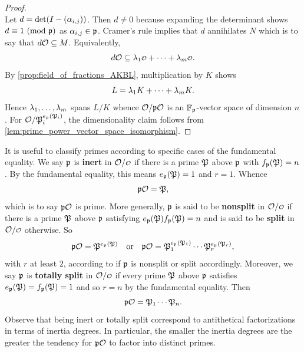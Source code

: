\begin{proof}
\[      \]
      Let \(d = \det(I-(\alpha_{i,j}))\). Then \(d \neq 0\) because expanding the determinant shows \(d \equiv 1 \ (\mathrm{mod}\text{ }\mathfrak{p})\) as \(\alpha_{i,j} \in \mathfrak{p}\). Cramer's rule implies that \(d\) annihilates \(N\) which is to say that \(d\mathcal{O} \subseteq M\). Equivalently,
      \[
        d\mc{O} \subseteq \l_{1}\smc{O}+\cdots+\l_{m}\smc{O}.
      \]
      By \cref{prop:field_of_fractions_AKBL}, multiplication by \(K\) shows
      \[
        L = \lambda_{1}K+\cdots+\lambda_{m}K.
      \]
      Hence \(\lambda_{1},\ldots,\lambda_{m}\) spans \(L/K\) whence \(\mathcal{O}/\mathfrak{p}\mathcal{O}\) is an \(\mathbb{F}_{\mathfrak{p}}\)-vector space of dimension \(n\). For \(\mathcal{O}/\mathfrak{P}_{i}^{e_{\mathfrak{p}}(\mathfrak{P}_{i})}\), the dimensionality claim follows from \cref{lem:prime_power_vector_space_isomorphism}.
    \end{proof}

    It is useful to classify primes according to specific cases of the fundamental equality. We say \(\mathfrak{p}\) is \textbf{inert} in \(\mc{O}/\smc{O}\) if there is a prime \(\mathfrak{P}\) above \(\mathfrak{p}\) with \(f_{\mathfrak{p}}(\mathfrak{P}) = n\). By the fundamental equality, this means \(e_{\mathfrak{p}}(\mathfrak{P}) = 1\) and \(r = 1\). Whence
    \[
      \mathfrak{p}\mathcal{O} = \mathfrak{P},
    \]
    which is to say \(\mathfrak{p}\mathcal{O}\) is prime. More generally, \(\mathfrak{p}\) is said to be \textbf{nonsplit} in \(\mc{O}/\smc{O}\) if there is a prime \(\mathfrak{P}\) above \(\mathfrak{p}\) satisfying \(e_{\mathfrak{p}}(\mathfrak{P})f_{\mathfrak{p}}(\mathfrak{P}) = n\) and is said to be \textbf{split} in \(\mc{O}/\smc{O}\) otherwise. So
    \[
      \mathfrak{p}\mathcal{O} = \mathfrak{P}^{e_{\mathfrak{p}}(\mathfrak{P})} \quad \text{or} \quad \mathfrak{p}\mathcal{O} = \mathfrak{P}_{1}^{e_{\mathfrak{p}}(\mathfrak{P}_{1})} \cdots \mathfrak{P}_{r}^{e_{\mathfrak{p}}(\mathfrak{P}_{r})},
    \]
    with \(r\) at least \(2\), according to if \(\mathfrak{p}\) is nonsplit or split accordingly. Moreover, we say \(\mathfrak{p}\) is \textbf{totally split} in \(\mc{O}/\smc{O}\) if every prime \(\mathfrak{P}\) above \(\mathfrak{p}\) satisfies \(e_{\mathfrak{p}}(\mathfrak{P}) = f_{\mathfrak{p}}(\mathfrak{P}) = 1\) and so \(r = n\) by the fundamental equality. Then
    \[
      \mathfrak{p}\mathcal{O} = \mathfrak{P}_{1} \cdots \mathfrak{P}_{n}.
    \]
    Observe that being inert or totally split correspond to antithetical factorizations in terms of inertia degrees. In particular, the smaller the inertia degrees are the greater the tendency for \(\mathfrak{p}\mathcal{O}\) to factor into distinct primes.
    
